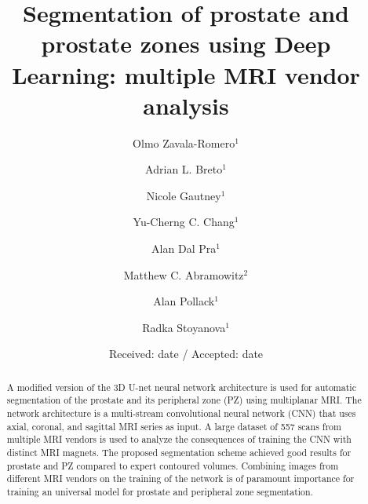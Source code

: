 \documentclass[smallextended,referee]{svjour3}
\begin{document}
\title{ Segmentation of prostate and prostate zones using Deep Learning: multiple MRI vendor analysis }

\author{
  Olmo Zavala-Romero$^1$ \and
  Adrian L. Breto$^1$ \and  
  Nicole Gautney$^1$ \and  
  Yu-Cherng C. Chang$^1$ \and 
  Alan Dal Pra$^1$ \and  
  Matthew C. Abramowitz$^2$ \and  
  Alan Pollack$^1$ \and  
  Radka Stoyanova$^1$
}


\date{Received: date / Accepted: date}

\maketitle

\begin{abstract}
A modified version of the 3D U-net  neural network architecture is used for automatic segmentation of the prostate and its peripheral zone (PZ) using multiplanar MRI. The network architecture is a multi-stream convolutional neural network (CNN) that uses axial, coronal, and sagittal MRI series as input.  A large dataset of 557 scans from multiple MRI vendors is used to analyze the consequences of training the CNN with distinct MRI magnets. The proposed segmentation scheme achieved good results for prostate and PZ compared to expert contoured volumes. Combining images from different MRI vendors on the training of the network is of paramount importance for training an universal model for prostate and peripheral zone segmentation. 

\end{abstract}









\end{document}
